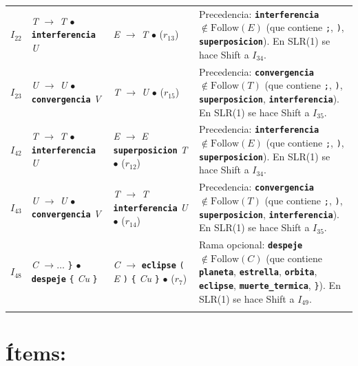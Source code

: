 \documentclass[12pt, letterpaper]{article}
\begin{document}
{\begin{longtable}{c p{3.6cm} p{3.6cm} p{5.8cm}}
$I_{22}$ & \textit{T} $\to$ \textit{T} $\bullet$ \textbf{\texttt{interferencia}} \textit{U} & \textit{E} $\to$ \textit{T} $\bullet$ ($r_{13}$) & Precedencia: \textbf{\texttt{interferencia}} $\notin \text{Follow}(\textit{E})$ (que contiene \texttt{;}, \texttt{)}, \textbf{\texttt{superposicion}}). En SLR(1) se hace Shift a $I_{34}$. \\
\addlinespace[3pt]
$I_{23}$ & \textit{U} $\to$ \textit{U} $\bullet$ \textbf{\texttt{convergencia}} \textit{V} & \textit{T} $\to$ \textit{U} $\bullet$ ($r_{15}$) & Precedencia: \textbf{\texttt{convergencia}} $\notin \text{Follow}(\textit{T})$ (que contiene \texttt{;}, \texttt{)}, \textbf{\texttt{superposicion}}, \textbf{\texttt{interferencia}}). En SLR(1) se hace Shift a $I_{35}$. \\
\addlinespace[3pt]
$I_{42}$ & \textit{T} $\to$ \textit{T} $\bullet$ \textbf{\texttt{interferencia}} \textit{U} & \textit{E} $\to$ \textit{E} \textbf{\texttt{superposicion}} \textit{T} $\bullet$ ($r_{12}$) & Precedencia: \textbf{\texttt{interferencia}} $\notin \text{Follow}(\textit{E})$ (que contiene \texttt{;}, \texttt{)}, \textbf{\texttt{superposicion}}). En SLR(1) se hace Shift a $I_{34}$. \\
\addlinespace[3pt]
$I_{43}$ & \textit{U} $\to$ \textit{U} $\bullet$ \textbf{\texttt{convergencia}} \textit{V} & \textit{T} $\to$ \textit{T} \textbf{\texttt{interferencia}} \textit{U} $\bullet$ ($r_{14}$) & Precedencia: \textbf{\texttt{convergencia}} $\notin \text{Follow}(\textit{T})$ (que contiene \texttt{;}, \texttt{)}, \textbf{\texttt{superposicion}}, \textbf{\texttt{interferencia}}). En SLR(1) se hace Shift a $I_{35}$. \\
\addlinespace[3pt]
$I_{48}$ & \textit{C} $\to \dots$ \texttt{\}} $\bullet$ \textbf{\texttt{despeje}} \texttt{\{} \textit{Cu} \texttt{\}} & \textit{C} $\to$ \textbf{\texttt{eclipse}} \texttt{(} \textit{E} \texttt{)} \texttt{\{} \textit{Cu} \texttt{\}} $\bullet$ ($r_{7}$) & Rama opcional: \textbf{\texttt{despeje}} $\notin \text{Follow}(\textit{C})$ (que contiene \textbf{\texttt{planeta}}, \textbf{\texttt{estrella}}, \textbf{\texttt{orbita}}, \textbf{\texttt{eclipse}}, \textbf{\texttt{muerte\_termica}}, \texttt{\}}). En SLR(1) se hace Shift a $I_{49}$. \\
\addlinespace[3pt]
\end{longtable}
}

\newpage

\section{Ítems:}
\end{document}
